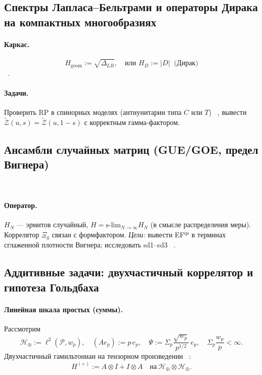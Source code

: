\documentclass{article}
\numberwithin{equation}{section}
\theoremstyle{plain}
\theoremstyle{definition}
\theoremstyle{remark}
\def\infty{∞}\def\partial{∂}\def\sum{Σ}\def\int{∫}%
\begin{document}
\subsection*{Спектры Лапласа–Бельтрами и операторы Дирака на компактных многообразиях}
\paragraph{Каркас.}
\begin{equation}
H_{\mathrm{geom}}:=\sqrt{\Delta_{LB}},\quad \text{или } H_D:=|D|\ \text{ (Дирак)}
\end{equation} ~\cite{MinakshisundaramPleijel1949, Gilkey1995}.
\paragraph{Задачи.}
Проверить RP в спинорных моделях (антиунитарии типа \(C\) или \(T\)) ~\cite{Thaller1992, BerlineGetzlerVergne1992}, вывести \(\widetilde{\mathcal Z}(u,s)=\widetilde{\mathcal Z}(u,1-s)\) с корректным гамма-фактором.

\subsection*{Ансамбли случайных матриц (GUE/GOE, предел Вигнера)}
~\cite{Mehta2004, Dyson1962}
\paragraph{Оператор.}
\(H_N\) — эрмитов случайный, \(H=\mathrm{s\mbox{-}lim}_{N\to\infty}H_N\) (в смысле распределения меры). Коррелятор \(\Xi_g\) связан с формфактором. \emph{Цели:} вывести EF\(^{\mathrm{qs}}\) 
в терминах сглаженной плотности Вигнера; исследовать sd1–sd3 ~\cite{Haake2010, BerryKeating1999}.

\subsection*{Аддитивные задачи: двухчастичный коррелятор и гипотеза Гольдбаха}
\paragraph{Линейная шкала простых (суммы).}
Рассмотрим
\begin{equation}
\mathcal H_{\oplus}:=\ell^2(\mathcal P,w_p),\quad (A e_p):=p\,e_p,\quad 
\Psi:=\sum_{p} \frac{\sqrt{w_p}}{p^{1/2}}\,e_p,\quad 
\sum_{p}\frac{w_p}{p}<\infty.
\end{equation}
Двухчастичный гамильтониан на тензорном произведении ~\cite{ReedSimonI}:
\begin{equation}
H^{(+)}:=A\otimes I + I\otimes A\quad \text{на}\ \mathcal H_{\oplus}\otimes\mathcal H_{\oplus}.
\end{equation}
\end{document}

